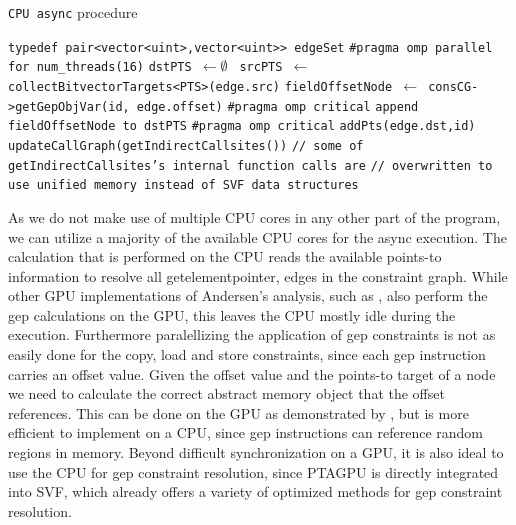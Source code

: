 \begin{algorithm}
    \caption[CPU Async Procedure Pseudocode]{\texttt{CPU async} procedure}\label{alg:ptagpu-cpu}
    \begin{algorithmic}
        \State \texttt{typedef pair<vector<uint>,vector<uint>> edgeSet} 
        \State \texttt{\#pragma omp parallel for num\_threads(16)}
        \State \texttt{dstPTS $\leftarrow \emptyset$ }
        \State \texttt{srcPTS $\leftarrow$ collectBitvectorTargets<PTS>(edge.src)}
        \State \texttt{fieldOffsetNode $\leftarrow$ consCG->getGepObjVar(id, edge.offset)}
        \State \texttt{\#pragma omp critical} 
        \State \texttt{append fieldOffsetNode to dstPTS}
        \EndFor
        \State \texttt{\#pragma omp critical}
        \State \texttt{addPts(edge.dst,id)}
        \EndFor
        \EndFor
        \State \texttt{updateCallGraph(getIndirectCallsites())} 
        \State \texttt{// some of getIndirectCallsites's internal function calls are}
        \State \texttt{// overwritten to use unified memory instead of SVF data structures}
        \EndProcedure
    \end{algorithmic}
\end{algorithm}
As we do not make use of multiple CPU cores in any other part of the program, we can utilize a majority of the available CPU cores for the async execution.
The calculation that is performed on the CPU reads the available points-to information to resolve all getelementpointer, edges in the constraint graph.
While other GPU implementations of Andersen's analysis, such as \cite{mendez2012gpu}, also perform the gep calculations on the GPU, this leaves the CPU mostly idle during the execution.
Furthermore paralellizing the application of gep constraints is not as easily done for the copy, load and store constraints, since each gep instruction carries an offset value. Given the offset value and the points-to target of a node we need to calculate the correct abstract memory object that the offset references. This can be done on the GPU as demonstrated by \cite{mendez2012gpu}, but is more efficient to implement on a CPU, since gep instructions can reference random regions in memory.
Beyond difficult synchronization on a GPU, it is also ideal to use the CPU for gep constraint resolution, since PTAGPU is directly integrated into SVF, which already offers a variety of optimized methods for gep constraint resolution.
